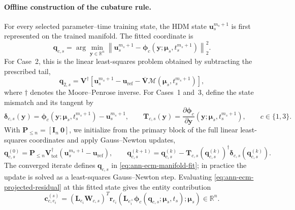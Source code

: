 \documentclass[11pt]{article}
\begin{document}
\paragraph{Offline construction of the cubature rule.}
For every selected parameter--time training state, the HDM state
$\mathbf u_s^{m_s+1}$ is first represented on the trained manifold.  The
fitted coordinate is
\begin{equation}
\mathbf q_{c,s}
=
\arg\min_{\mathbf y\in\mathbb R^n}
\left\|
\mathbf u_s^{m_s+1}
-\boldsymbol\phi_c(\mathbf y;\bm\mu_s,t_s^{m_s+1})
\right\|_2^2.
\label{eq:ann-ecm-manifold-fit}
\end{equation}
For Case~2, this is the linear least-squares problem obtained by subtracting
the prescribed tail,
\begin{equation}
\mathbf q_{2,s}
=
\mathbf V^{\dagger}
\left[
\mathbf u_s^{m_s+1}-\mathbf u_{\mathrm{ref}}
-\overline{\mathbf V}\mathcal M(\bm\mu_s,t_s^{m_s+1})
\right],
\label{eq:ann-ecm-case2-fit}
\end{equation}
where $\dagger$ denotes the Moore--Penrose inverse.  For Cases~1 and~3,
define the state mismatch and its tangent by
\begin{equation}
\boldsymbol\delta_{c,s}(\mathbf y)
=\boldsymbol\phi_c(\mathbf y;\bm\mu_s,t_s^{m_s+1})
-\mathbf u_s^{m_s+1},
\qquad
\mathbf T_{c,s}(\mathbf y)
=\frac{\partial\boldsymbol\phi_c}
{\partial\mathbf y}(\mathbf y;\bm\mu_s,t_s^{m_s+1}),
\qquad c\in\{1,3\}.
\label{eq:ann-ecm-fit-mismatch}
\end{equation}
With $\mathbf P_{\leq n}=[\mathbf I_n\ \mathbf 0]$, we initialize from the
primary block of the full linear least-squares coordinates and apply
Gauss--Newton updates,
\begin{equation}
\mathbf q_{c,s}^{(0)}
=\mathbf P_{\leq n}\mathbf V_{\mathrm{tot}}^{\dagger}
\left(\mathbf u_s^{m_s+1}-\mathbf u_{\mathrm{ref}}\right),
\qquad
\mathbf q_{c,s}^{(k+1)}
=\mathbf q_{c,s}^{(k)}
-\mathbf T_{c,s}\!\left(\mathbf q_{c,s}^{(k)}\right)^{\dagger}
\boldsymbol\delta_{c,s}\!\left(\mathbf q_{c,s}^{(k)}\right).
\label{eq:ann-ecm-nonlinear-fit-update}
\end{equation}
The converged iterate defines $\mathbf q_{c,s}$ in
\eqref{eq:ann-ecm-manifold-fit}; in practice the update is solved as a
least-squares Gauss--Newton step.  Evaluating
\eqref{eq:ann-ecm-projected-residual} at this fitted state gives the entity
contribution
\begin{equation}
\mathbf c_{c,e_i}^{(s)}
=
\left(\mathbf L_{e_i}\mathbf W_{c,s}\right)^T
\mathbf r_{e_i}
\!\left(\mathbf L_{e_i^+}\boldsymbol\phi_c(\mathbf q_{c,s};\bm\mu_s,t_s);\bm\mu_s\right)
\in\mathbb R^n.
\label{eq:ann-ecm-training-contribution}
\end{equation}
\end{document}

